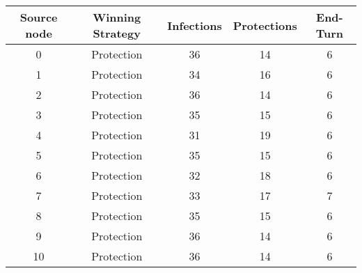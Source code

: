 \documentclass[results.tex]{subfiles}
\begin{document}
    \begin{center}
        \begin{tabular}{| c || c | c | c | c |}
            \hline
            {\bfseries Source node} & {\bfseries Winning Strategy} & {\bfseries Infections} & {\bfseries Protections}
            & {\bfseries End-Turn}
            \\  %
            \hline\hline
            0                       & Protection                   & 36                     & 14                      & 6                    \\
            \hline
            1                       & Protection                   & 34                     & 16                      & 6                    \\
            \hline
            2                       & Protection                   & 36                     & 14                      & 6                    \\
            \hline
            3                       & Protection                   & 35                     & 15                      & 6                    \\
            \hline
            4                       & Protection                   & 31                     & 19                      & 6                    \\
            \hline
            5                       & Protection                   & 35                     & 15                      & 6                    \\
            \hline
            6                       & Protection                   & 32                     & 18                      & 6                    \\
            \hline
            7                       & Protection                   & 33                     & 17                      & 7                    \\
            \hline
            8                       & Protection                   & 35                     & 15                      & 6                    \\
            \hline
            9                       & Protection                   & 36                     & 14                      & 6                    \\
            \hline
            10                      & Protection                   & 36                     & 14                      & 6                    \\

\end{tabular}
\end{center}
\end{document}
